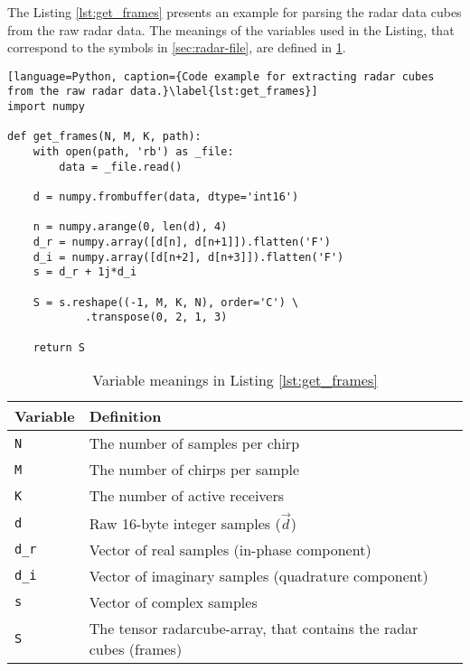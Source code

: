 The Listing \ref{lst:get_frames} presents an example for parsing the radar data cubes from the raw radar data.
The meanings of the variables used in the Listing,
that correspond to the symbols in \ref{sec:radar-file},
are defined in \ref{tab:get_frames_variable_definitions}.

\begin{lstlisting}[language=Python, caption={Code example for extracting radar cubes from the raw radar data.}\label{lst:get_frames}]
import numpy

def get_frames(N, M, K, path):
    with open(path, 'rb') as _file:
        data = _file.read()
        
    d = numpy.frombuffer(data, dtype='int16')

    n = numpy.arange(0, len(d), 4)
    d_r = numpy.array([d[n], d[n+1]]).flatten('F')
    d_i = numpy.array([d[n+2], d[n+3]]).flatten('F')
    s = d_r + 1j*d_i
    
    S = s.reshape((-1, M, K, N), order='C') \
            .transpose(0, 2, 1, 3)

    return S
\end{lstlisting}

\begin{table}[]
    \centering
    \begin{tabular}{l l}
        \toprule
            \textbf{Variable} & \textbf{Definition} \\
        \midrule
            \texttt{N} & The number of samples per chirp \\
            \texttt{M} & The number of chirps per sample \\
            \texttt{K} & The number of active receivers \\
            \texttt{d} & Raw 16-byte integer samples ($\vec{d}$) \\
            \texttt{d\_r} & Vector of real samples (in-phase component) \\
            \texttt{d\_i} & Vector of imaginary samples (quadrature component) \\
            \texttt{s} & Vector of complex samples \\
            \texttt{S} & The tensor \gls{radarcube-array}, that contains the radar cubes (frames) \\
        \bottomrule
    \end{tabular}
    \caption{Variable meanings in Listing \ref{lst:get_frames}}
    \label{tab:get_frames_variable_definitions}
\end{table}